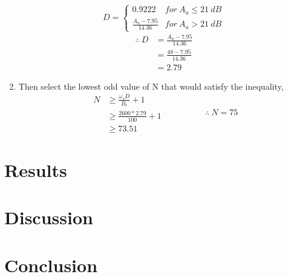 \documentclass[a4paper,11pt]{article}%
\begin{document}
\begin{enumerate}[\hspace{1cm}a.)]
\[
D = \begin{cases}
	0.9222 & for ~ A_a \leq 21 ~dB \\
	\frac{A_a - 7.95}{14.36} & for ~ A_a > 21 ~dB
\end{cases}
\]\hspace{2cm}
\[
\begin{split}
	\therefore~ D &= \frac{A_a - 7.95}{14.36}\\
	&=\frac{48 - 7.95}{14.36}\\
	&=  2.79
\end{split}
\]
\item Then select the lowest odd value of N that would satisfy the inequality,
\[
\begin{split}
	N  & \geq \frac{\omega_sD}{B_t}+1\\
	&\geq \frac{2600*2.79}{100}+1\\
	&\geq 73.51
\end{split}
\hspace{2cm}
\therefore~	N = 75
\]
\end{enumerate}

\section{Results}
\section{Discussion}
\section{Conclusion}
%


\pagebreak



\end{document}
